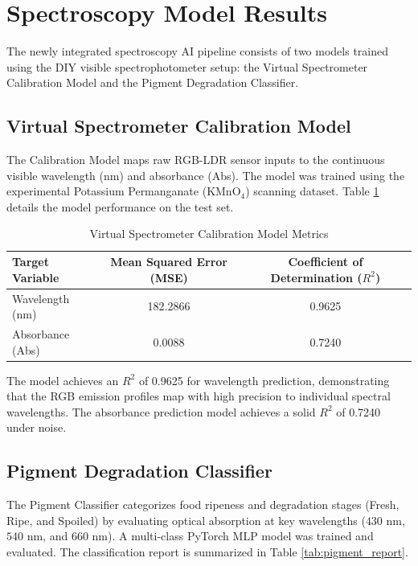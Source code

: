 \section{Spectroscopy Model Results}
The newly integrated spectroscopy AI pipeline consists of two models trained using the DIY visible spectrophotometer setup: the Virtual Spectrometer Calibration Model and the Pigment Degradation Classifier.

\subsection{Virtual Spectrometer Calibration Model}
The Calibration Model maps raw RGB-LDR sensor inputs to the continuous visible wavelength (nm) and absorbance (Abs). The model was trained using the experimental Potassium Permanganate ($\text{KMnO}_4$) scanning dataset. Table \ref{tab:cal_results} details the model performance on the test set.

\begin{table}[H]
\fontsize{10}{12}\selectfont
\centering
\caption{Virtual Spectrometer Calibration Model Metrics}
\label{tab:cal_results}
\begin{tabular}{|l|c|c|}
\hline
\textbf{Target Variable} & \textbf{Mean Squared Error (MSE)} & \textbf{Coefficient of Determination ($R^2$)} \\
\hline
Wavelength (nm) & 182.2866 & 0.9625 \\
\hline
Absorbance (Abs) & 0.0088 & 0.7240 \\
\hline
\end{tabular}
\end{table}

The model achieves an $R^2$ of 0.9625 for wavelength prediction, demonstrating that the RGB emission profiles map with high precision to individual spectral wavelengths. The absorbance prediction model achieves a solid $R^2$ of 0.7240 under noise.

\subsection{Pigment Degradation Classifier}
The Pigment Classifier categorizes food ripeness and degradation stages (Fresh, Ripe, and Spoiled) by evaluating optical absorption at key wavelengths ($430\text{ nm}$, $540\text{ nm}$, and $660\text{ nm}$). A multi-class PyTorch MLP model was trained and evaluated. The classification report is summarized in Table \ref{tab:pigment_report}.

